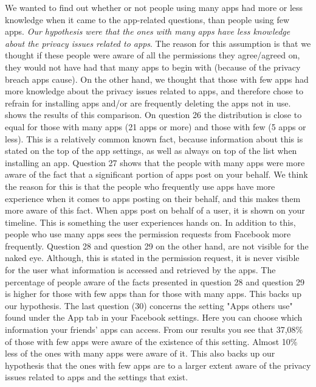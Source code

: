 We wanted to find out whether or not people using many apps had more or less knowledge when it came to the app-related questions, than people using few apps. \textit{Our hypothesis were that the ones with many apps have less knowledge about the privacy issues related to apps}. The reason for this assumption is that we thought if these people were aware of all the permissions they agree/agreed on, they would not have had that many apps to begin with (because of the privacy breach apps cause). On the other hand, we thought that those with few apps had more knowledge about the privacy issues related to apps, and therefore chose to refrain for installing apps and/or are frequently deleting the apps not in use.
 shows the results of this comparison. On question 26 the distribution is close to equal for those with many apps (21 apps or more) and those with few (5 apps or less). This is a relatively common known fact, because information about this is stated on the top of the app settings, as well as always on top of the list when installing an app. Question 27 shows that the people with many apps were more aware of the fact that a significant portion of apps post on your behalf. We think the reason for this is that the people who frequently use apps have more experience when it comes to apps posting on their behalf, and this makes them more aware of this fact. When apps post on behalf of a user, it is shown on your timeline. This is something the user experiences hands on. In addition to this, people who use many apps sees the permission requests from Facebook more frequently. Question 28 and question 29 on the other hand, are not visible for the naked eye. Although, this is stated in the permission request, it is never visible for the user what information is accessed and retrieved by the apps. The percentage of people aware of the facts presented in question 28 and question 29 is higher for those with few apps than for those with many apps. This backs up our hypothesis. The last question (30) concerns the setting "Apps others use" found under the App tab in your Facebook settings. Here you can choose which information your friends' apps can access. From our results you see that 37,08\% of those with few apps were aware of the existence of this setting. Almost 10\% less of the ones with many apps were aware of it. This also backs up our hypothesis that the ones with few apps are to a larger extent aware of the privacy issues related to apps and the settings that exist. 

